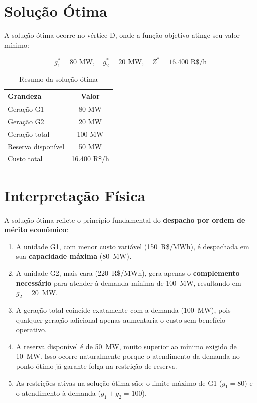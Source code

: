 \documentclass[12pt,a4paper]{article}
\begin{document}
\section{Solução Ótima}

A solução ótima ocorre no vértice D, onde a função objetivo atinge seu valor mínimo:

\begin{equation}
\boxed{g_1^* = 80 \text{ MW}, \quad g_2^* = 20 \text{ MW}, \quad Z^* = 16.400 \text{ R\$/h}}
\end{equation}

\begin{table}[H]
\centering
\caption{Resumo da solução ótima}
\begin{tabular}{@{}lc@{}}
\toprule
Grandeza & Valor \\
\midrule
Geração G1 & 80 MW \\
Geração G2 & 20 MW \\
Geração total & 100 MW \\
Reserva disponível & 50 MW \\
Custo total & 16.400 R\$/h \\
\bottomrule
\end{tabular}
\end{table}

\section{Interpretação Física}

A solução ótima reflete o princípio fundamental do \textbf{despacho por ordem de mérito econômico}:

\begin{enumerate}
    \item A unidade G1, com menor custo variável (150~R\$/MWh), é despachada em sua \textbf{capacidade máxima} (80~MW).
    
    \item A unidade G2, mais cara (220~R\$/MWh), gera apenas o \textbf{complemento necessário} para atender à demanda mínima de 100~MW, resultando em $g_2 = 20$~MW.
    
    \item A geração total coincide exatamente com a demanda (100~MW), pois qualquer geração adicional apenas aumentaria o custo sem benefício operativo.
    
    \item A reserva disponível é de 50~MW, muito superior ao mínimo exigido de 10~MW. Isso ocorre naturalmente porque o atendimento da demanda no ponto ótimo já garante folga na restrição de reserva.
    
    \item As restrições ativas na solução ótima são: o limite máximo de G1 ($g_1 = 80$) e o atendimento à demanda ($g_1 + g_2 = 100$).
\end{enumerate}
\end{document}
